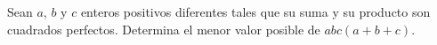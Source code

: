 Sean $a$, $b$ y $c$ enteros positivos diferentes tales que su suma y su producto son cuadrados perfectos. Determina el menor valor posible de $abc(a + b + c)$.